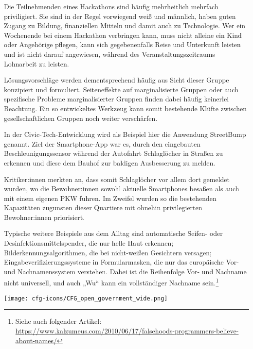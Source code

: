 Die Teilnehmenden eines Hackathons sind häufig mehrheitlich mehrfach priviligiert. Sie sind in der Regel vorwiegend weiß und männlich, haben guten Zugang zu Bildung, finanziellen Mitteln und damit auch zu Technologie. Wer ein Wochenende bei einem Hackathon verbringen kann, muss nicht alleine ein Kind oder Angehörige pflegen, kann sich gegebenenfalls Reise und Unterkunft leisten und ist nicht darauf angewiesen, während des Veranstaltungszeitraums Lohnarbeit zu leisten. 

Lösungsvorschläge werden dementsprechend häufig aus Sicht dieser Gruppe konzipiert und formuliert. Seiteneffekte auf marginalisierte Gruppen oder auch spezifische Probleme marginalisierter Gruppen finden dabei häufig keinerlei Beachtung. Ein so entwickeltes Werkzeug kann somit bestehende Klüfte zwischen gesellschaftlichen Gruppen noch weiter verschärfen.

\begin{kaobox}
	In der Civic-Tech-Entwicklung wird als Beispiel hier die Anwendung StreetBump genannt. Ziel der Smartphone-App war es, durch den eingebauten Beschleunigungssensor während der Autofahrt Schlaglöcher in Straßen zu erkennen und diese dem Bauhof zur baldigen Ausbesserung zu melden. 
	
	Kritiker:innen merkten an, dass somit Schlaglöcher vor allem dort gemeldet wurden, wo die Bewohner:innen sowohl aktuelle Smartphones besaßen als auch mit einem eigenen PKW fuhren. Im Zweifel wurden so die bestehenden Kapazitäten zugunsten dieser Quartiere mit ohnehin privilegierten Bewohner:innen priorisiert.
	
	Typische weitere Beispiele aus dem Alltag sind automatische Seifen- oder Desinfektionsmittelspender, die nur helle Haut erkennen; Bilderkennungsalgorithmen, die bei nicht-weißen Gesichtern versagen; Eingabeverifizierungssysteme in Formularmasken, die nur das europäische Vor- und Nachnamenssystem verstehen. Dabei ist die Reihenfolge Vor- und Nachname nicht universell, und auch „Wu“ kann ein vollständiger Nachname sein.\footnote{Siehe auch folgender Artikel: \url{https://www.kalzumeus.com/2010/06/17/falsehoods-programmers-believe-about-names/}}
\end{kaobox}


\vspace{0cm}
\begin{figure*}[h!]
	\texttt{[image: cfg-icons/CFG\_open\_government\_wide.png]}
\end{figure*}

